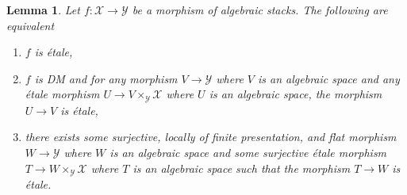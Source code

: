 \documentclass{stacks-project}
\theoremstyle{plain}
\newtheorem{lemma}[subsection]{Lemma}
\theoremstyle{definition}
\theoremstyle{remark}
\numberwithin{equation}{subsection}
\begin{document}
\begin{lemma}
\label{lemma-etale}
Let $f : \mathcal{X} \to \mathcal{Y}$ be a morphism of algebraic stacks.
The following are equivalent
\begin{enumerate}
\item $f$ is \'etale,
\item $f$ is DM and for any morphism $V \to \mathcal{Y}$
where $V$ is an algebraic space and any \'etale morphism
$U \to V \times_\mathcal{Y} \mathcal{X}$ where $U$ is an algebraic space,
the morphism $U \to V$ is \'etale,
\item there exists some surjective, locally of finite presentation, and flat
morphism $W \to \mathcal{Y}$ where $W$ is an algebraic space and some
surjective \'etale morphism $T \to W \times_\mathcal{Y} \mathcal{X}$
where $T$ is an algebraic space such that the morphism $T \to W$ is \'etale.
\end{enumerate}
\end{lemma}
\end{document}
